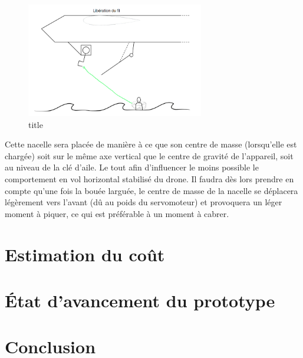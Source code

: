 \documentclass[a4paper,12pt,french]{report}
\begin{document}
\begin{figure}[h]
    \centering
    \includegraphics[height=5cm]{figures/b4.png}
    \caption{title}
\end{figure}

Cette nacelle sera placée de manière à ce que son centre de masse (lorsqu’elle est chargée) soit sur le même axe vertical que le centre de gravité de l’appareil, soit au niveau de la clé d’aile. Le tout afin d’influencer le moins possible le comportement en vol horizontal stabilisé du drone. Il faudra dès lors prendre en compte qu’une fois la bouée larguée, le centre de masse de la nacelle se déplacera légèrement vers l’avant (dû au poids du servomoteur) et provoquera un léger moment à piquer, ce qui est préférable à un moment à cabrer.

\chapter{Estimation du coût}

\chapter{État d'avancement du prototype}

\chapter*{Conclusion}
\end{document}
